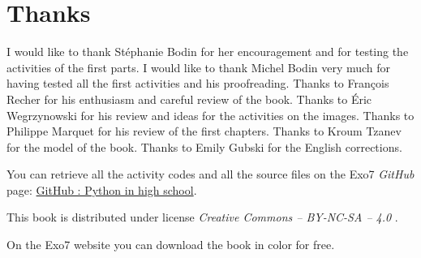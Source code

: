 
\clearemptydoublepage
\pagestyle{empty}\thispagestyle{empty}

\vspace*{\fill}

\section*{Thanks}


I would like to thank Stéphanie Bodin for her encouragement and for testing the activities of the first parts.
I would like to thank Michel Bodin very much for having tested all the first activities and his proofreading.
Thanks to François Recher for his enthusiasm and careful review of the book. 
Thanks to Éric Wegrzynowski for his review and ideas for the activities on the images. 
Thanks to Philippe Marquet for his review of the first chapters. Thanks to Kroum Tzanev for the model of the book.
Thanks to Emily Gubski for the English corrections.

\bigskip

\begin{center}
You can retrieve all the activity codes \Python{} and all the source files on the Exo7 \emph{GitHub} page:
\href{https://github.com/exo7math/python1-en-exo7}{\og{}GitHub : Python in high school\fg{}}.

\medskip




\end{center}


\vspace*{\fill}

\bigskip 

\begin{center}
\end{center}



\begin{center}
This book is distributed under license \emph{Creative Commons -- BY-NC-SA -- 4.0 }.

On the Exo7 website you can download the book in color for free.
\end{center}




\printindex
{}

